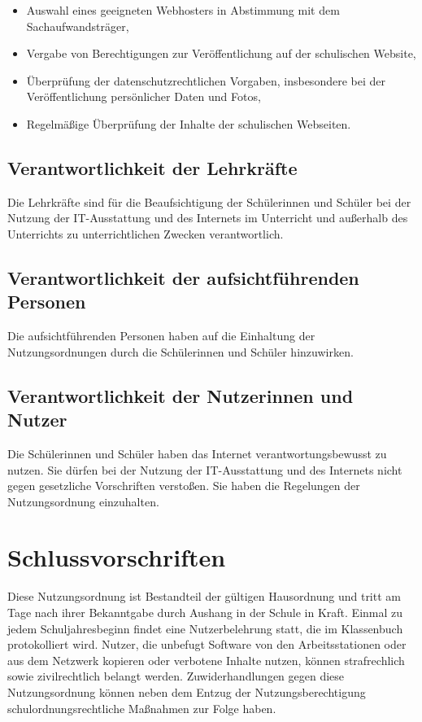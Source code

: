 \documentclass[a4paper, parskip]{scrartcl}
\begin{document}
\begin{itemize}
	\item{Auswahl eines geeigneten Webhosters in Abstimmung mit dem
		Sachaufwandsträger,}
	\item{Vergabe von Berechtigungen zur Veröffentlichung auf der
		schulischen Website,}
	\item{Überprüfung der datenschutzrechtlichen Vorgaben, insbesondere bei
		der Veröffentlichung persönlicher Daten und Fotos,}
	\item{Regelmäßige Überprüfung der Inhalte der schulischen Webseiten.}
\end{itemize}

\subsection{Verantwortlichkeit der Lehrkräfte}
Die Lehrkräfte sind für die Beaufsichtigung der Schülerinnen und Schüler bei
der Nutzung der IT-Ausstattung und des Internets im Unterricht und außerhalb
des Unterrichts zu unterrichtlichen Zwecken verantwortlich.
\subsection{Verantwortlichkeit der aufsichtführenden Personen}
Die aufsichtführenden Personen haben auf die Einhaltung der Nutzungsordnungen
durch die Schülerinnen und Schüler hinzuwirken.
\subsection{Verantwortlichkeit der Nutzerinnen und Nutzer}
Die Schülerinnen und Schüler haben das Internet verantwortungsbewusst zu
nutzen. Sie dürfen bei der Nutzung der IT-Ausstattung und des Internets nicht
gegen gesetzliche Vorschriften verstoßen. Sie haben die Regelungen der
Nutzungsordnung einzuhalten.

\section{Schlussvorschriften}
Diese Nutzungsordnung ist Bestandteil der gültigen Hausordnung und tritt am
Tage nach ihrer Bekanntgabe durch Aushang in der Schule in Kraft. Einmal zu
jedem Schuljahresbeginn findet eine Nutzerbelehrung statt, die im Klassenbuch
protokolliert wird. Nutzer, die unbefugt Software von den Arbeitsstationen oder
aus dem Netzwerk kopieren oder verbotene Inhalte nutzen, können strafrechlich
sowie zivilrechtlich belangt werden. Zuwiderhandlungen gegen diese
Nutzungsordnung können neben dem Entzug der Nutzungsberechtigung
schulordnungsrechtliche Maßnahmen zur Folge haben.
\end{document}
